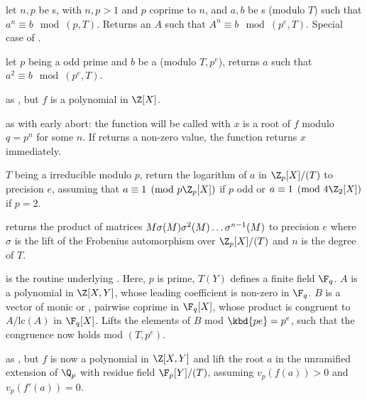  let
$n,p$ be s, with $n,p > 1$ and $p$ coprime to $n$, and $a,b$
be s (modulo $T$) such that $a^n \equiv b \mod (p,T)$.
Returns an  $A$ such that $A^n \equiv b \mod (p^e, T)$.
Special case of .

 let
$p$ being a odd prime and $b$ be a  (modulo $T, p^e$),
returns $a$ such that $a^2 \equiv b \mod (p^e, T)$.

as , but $f$ is a polynomial in $\Z[X]$.

as  with early abort: the function 
will be called with $x$ is a root of $f$ modulo $q=p^n$ for some $n$. If
 returns a non-zero value, the function returns $x$ immediately.

 $T$ being a 
irreducible modulo $p$, return the logarithm of $a$ in $\Z_p[X]/(T)$ to
precision $e$, assuming that $a\equiv 1 \pmod{p\Z_p[X]}$ if $p$ odd or
$a\equiv 1 \pmod{4\Z_2[X]}$ if $p=2$.




returns the product of matrices $M\*\sigma(M)\*\sigma^2(M)\ldots\sigma^{n-1}(M)$
to precision $e$ where $\sigma$ is the lift of the Frobenius automorphism
over $\Z_p[X]/(T)$ and $n$ is the degree of $T$.


 is the
routine underlying . Here, $p$ is prime, $T(Y)$ defines a
finite field $\F_q$. $A$ is a polynomial in $\Z[X,Y]$, whose leading
coefficient is non-zero in $\F_q$. $B$ is a vector of monic or ,
pairwise coprime in $\F_q[X]$, whose product is congruent to $A/\text{lc}(A)$
in $\F_q[X]$. Lifts the elements of $B$ mod $\kbd{pe} = p^e$, such that the
congruence now holds mod $(T,p^e)$.

 as
, but $f$ is now a polynomial in $\Z[X,Y]$ and lift the
root $a$ in the unramified extension of $\Q_p$ with residue field $\F_p[Y]/(T)$,
assuming $v_p(f(a))>0$ and $v_p(f'(a))=0$.

